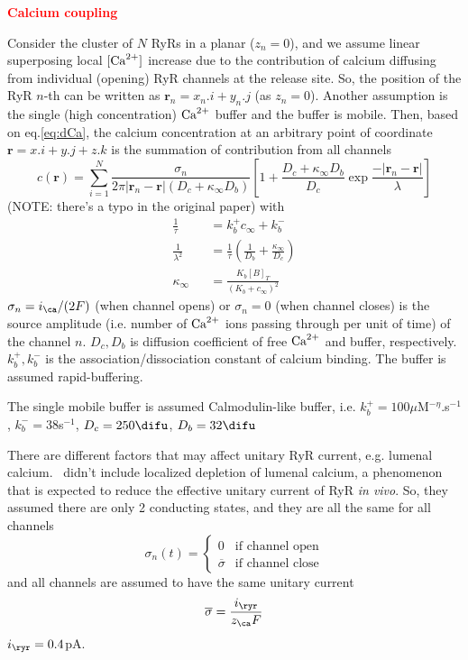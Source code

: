 \textcolor{red}{\bf Calcium coupling}

Consider the cluster of $N$ RyRs in a planar ($z_n=0$), and we assume
linear superposing local $[{\text{Ca}^{2+}}]$ increase due to the contribution of
calcium diffusing from individual (opening) RyR channels at the
release site. So, the position of the RyR $n$-th can be written as
$\mathbf{r}_n=x_n.i+y_n.j$ (as $z_n=0$). Another assumption is the single (high
concentration) ${\text{Ca}^{2+}}$ buffer and the buffer is mobile. Then, based on
eq.\ref{eq:dCa}, the calcium concentration at an arbitrary point of coordinate
$\mathbf{r}=x.i+y.j+z.k$ is the summation of contribution from all channels
\begin{equation}
  \label{eq:1144}
  c(\mathbf{r})=\sum^N_{i=1}\frac{\sigma_n}{2\pi|\mathbf{r}_n-\mathbf{r}|(D_c+\kappa_\infty
    D_b)}\left[1+\frac{D_c + \kappa_\infty
    D_b}{D_c}\exp\frac{-|\mathbf{r}_n-\mathbf{r}|}{\lambda}\right]
\end{equation}
(NOTE: there's a typo in the original paper) with 
\begin{eqnarray}
  \label{eq:1145}
  \frac{1}{\tau} &&= k^+_bc_\infty + k^-_b \\
  \frac{1}{\lambda^2}&&=\frac{1}{\tau}\left(\frac{1}{D_b}+\frac{\kappa_\infty}{D_c}\right)
  \\
  \kappa_\infty &&= \frac{K_b[B]_T}{(K_b+c_\infty)^2} 
\end{eqnarray}
$\sigma_n=i_\ca/(2F)$ (when channel opens) or $\sigma_n=0$ (when channel closes)
is the source amplitude (i.e. number of ${\text{Ca}^{2+}}$ ions passing through per unit of
time) of the channel $n$. $D_c,D_b$ is diffusion  coefficient of free ${\text{Ca}^{2+}}$ and
buffer, respectively. $k^+_b,k^-_b$ is  the association/dissociation constant of
calcium binding. The  buffer is assumed rapid-buffering.

\begin{framed}
  The single mobile buffer is assumed Calmodulin-like buffer, i.e.
  $k^+_b=100\mu$M$^{-\eta}$.s$^{-1}$, $k^-_b=38$s$^{-1}$,
  $D_c=250\difu$, $D_b=32\difu$
\end{framed}
\begin{framed}
  There are different factors that may affect unitary RyR current,
  e.g. lumenal calcium.~\citep{groff2008} didn't include localized
  depletion of lumenal calcium, a phenomenon that is expected to
  reduce the effective unitary current of RyR {\it in vivo}. So, they
  assumed there are only 2 conducting states, and they are all the
  same for all channels
  \begin{equation}
    \label{eq:1132}
    \sigma_n(t) = \left\{
      \begin{array}{ll}
        0 & \text{if channel open}\\
        \overline{\sigma} & \text{if channel close}
      \end{array}
    \right.
  \end{equation}
  and all channels are assumed to have the same unitary current
  \begin{equation}
    \label{eq:1133}
    \overline{\sigma} = \frac{i_\ryr}{z_\ca F}
  \end{equation}
  $i_\ryr=0.4$pA.
\end{framed}

